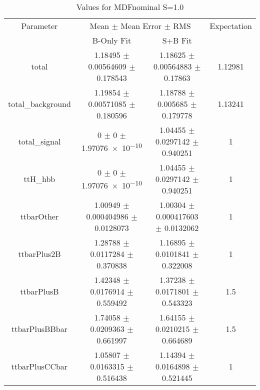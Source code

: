 \begin{table}
\centering
\caption{Values for MDFnominal S=1.0}
\begin{tabular}{cccc}
\toprule
Parameter & \multicolumn{2}{c}{Mean $\pm$ Mean Error $\pm$ RMS} & Expectation\\
 & B-Only Fit & S+B Fit & \\
\midrule
total & \num{1.18495} $\pm$ \num{0.00564609} $\pm$ \num{0.178543} & \num{1.18625} $\pm$ \num{0.00564883} $\pm$ \num{0.17863} & \num{1.12981}\\
total\_background & \num{1.19854} $\pm$ \num{0.00571085} $\pm$ \num{0.180596} & \num{1.18788} $\pm$ \num{0.005685} $\pm$ \num{0.179778} & \num{1.13241}\\
total\_signal & \num{0} $\pm$ \num{0} $\pm$ \num{1.97076e-10} & \num{1.04455} $\pm$ \num{0.0297142} $\pm$ \num{0.940251} & \num{1}\\
ttH\_hbb & \num{0} $\pm$ \num{0} $\pm$ \num{1.97076e-10} & \num{1.04455} $\pm$ \num{0.0297142} $\pm$ \num{0.940251} & \num{1}\\
ttbarOther & \num{1.00949} $\pm$ \num{0.000404986} $\pm$ \num{0.0128073} & \num{1.00304} $\pm$ \num{0.000417603} $\pm$ \num{0.0132062} & \num{1}\\
ttbarPlus2B & \num{1.28788} $\pm$ \num{0.0117284} $\pm$ \num{0.370838} & \num{1.16895} $\pm$ \num{0.0101841} $\pm$ \num{0.322008} & \num{1}\\
ttbarPlusB & \num{1.42348} $\pm$ \num{0.0176914} $\pm$ \num{0.559492} & \num{1.37238} $\pm$ \num{0.0171801} $\pm$ \num{0.543323} & \num{1.5}\\
ttbarPlusBBbar & \num{1.74058} $\pm$ \num{0.0209363} $\pm$ \num{0.661997} & \num{1.64155} $\pm$ \num{0.0210215} $\pm$ \num{0.664689} & \num{1.5}\\
ttbarPlusCCbar & \num{1.05807} $\pm$ \num{0.0163315} $\pm$ \num{0.516438} & \num{1.14394} $\pm$ \num{0.0164898} $\pm$ \num{0.521445} & \num{1}\\
\bottomrule
\end{tabular}
\end{table}